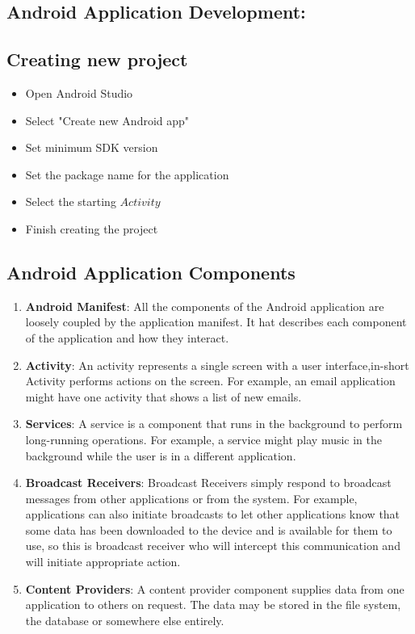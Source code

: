 \documentclass{article}
\begin{document}
\subsection{Android Application Development:}    
	\subsection {Creating new project}
    	\begin{itemize}
			\item Open Android Studio
        	\item Select "Create new Android app"
	        \item Set minimum SDK version
	        \item Set the package name for the application
	        \item Select the starting $Activity$
	        \item Finish creating the project
		\end{itemize}  
    \subsection {Android Application Components}
        \begin{enumerate}
        	\item \textbf{Android Manifest}: All the components of the Android application are loosely coupled by the application manifest. It hat describes each component of the application and how they interact.
			\item \textbf{Activity}: An activity represents a single screen with a user interface,in-short Activity performs actions on the screen. For example, an email application might have one activity that shows a list of new emails.
            \item \textbf{Services}: A service is a component that runs in the background to perform long-running operations. For example, a service might play music in the background while the user is in a different application.
            \item \textbf{Broadcast Receivers}: Broadcast Receivers simply respond to broadcast messages from other applications or from the system. For example, applications can also initiate broadcasts to let other applications know that some data has been downloaded to the device and is available for them to use, so this is broadcast receiver who will intercept this communication and will initiate appropriate action.
            \item \textbf{Content Providers}: A content provider component supplies data from one application to others on request. The data may be stored in the file system, the database or somewhere else entirely.
		\end{enumerate} 
        
\end{document}
